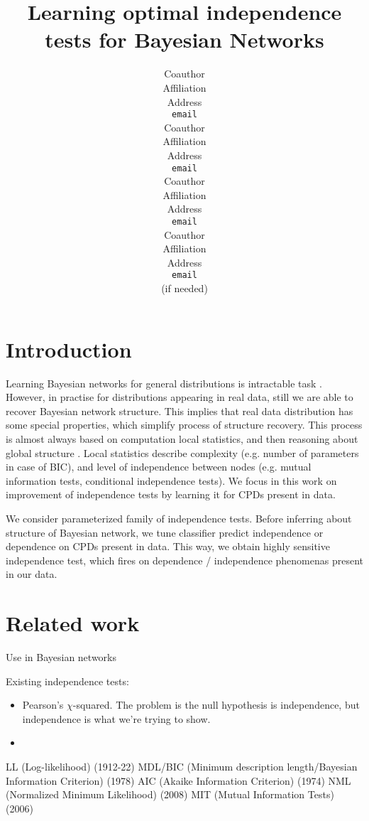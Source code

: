 \documentclass{article} %
\title{Learning optimal independence tests for Bayesian Networks}
\author{
\And
Coauthor \\
Affiliation \\
Address \\
\texttt{email} \\
\AND
Coauthor \\
Affiliation \\
Address \\
\texttt{email} \\
\And
Coauthor \\
Affiliation \\
Address \\
\texttt{email} \\
\And
Coauthor \\
Affiliation \\
Address \\
\texttt{email} \\
(if needed)\\
}
\begin{document}
\maketitle

\begin{abstract}

\end{abstract}


\section{Introduction}
Learning Bayesian networks for general distributions is
intractable task \cite{chickering1996learning}. However, in practise 
for distributions appearing in real data, still we are able to 
recover Bayesian network structure. This implies that real data
distribution has some special properties, which simplify process
of structure recovery. This process is almost always
based on computation local statistics, and then 
reasoning about global structure \cite{jaakkola2010learning, tsamardinos2006max}. 
Local statistics describe
complexity (e.g. number of parameters in case of BIC), and 
level of independence between nodes (e.g. mutual information tests, 
conditional independence tests). 
We focus in this work on improvement of independence tests by 
learning it for CPDs present in data.



We consider parameterized family of independence tests. 
Before inferring about structure of Bayesian network, we tune classifier 
predict independence or dependence on CPDs present in data. 
This way, we obtain highly sensitive independence test, which
fires on dependence / independence phenomenas present in our data. 


\section{Related work}
Use in Bayesian networks \cite{schafer2005empirical}

Existing independence tests:
\begin{itemize}
\item Pearson's $\chi$-squared.  The problem is the null hypothesis is independence, but independence is what we're trying to show.
\item
\end{itemize}

LL (Log-likelihood) (1912-22)
MDL/BIC (Minimum description length/Bayesian Information Criterion) (1978)
AIC (Akaike Information Criterion) (1974)
NML (Normalized Minimum Likelihood) (2008)
MIT (Mutual Information Tests) (2006)
\end{document}
